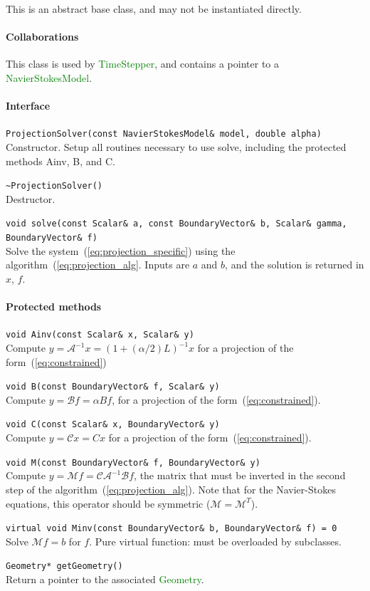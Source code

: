 \documentclass[11pt]{article}
\def\class#1{\textcolor{green}{\ttfamily\small #1}} %
\def\fn#1{{\ttfamily\small #1}} %
\let\code\lstinline
\begin{document}
This is an abstract base class, and may not be instantiated directly.

\paragraph{Collaborations}
This class is used by \class{TimeStepper}, and contains a pointer to a \class{NavierStokesModel}.

\paragraph{Interface}
\begin{description}
	\item \code|ProjectionSolver(const NavierStokesModel& model, double alpha)|\\
		Constructor.  Setup all routines necessary to use \fn{solve}, including the protected methods \fn{Ainv}, \fn{B}, and \fn{C}.
	\item \code|~ProjectionSolver()|\\
		Destructor.
	\item \code|void solve(const Scalar& a, const BoundaryVector& b, Scalar& gamma, BoundaryVector& f)|\\
	 	Solve the system~(\ref{eq:projection_specific}) using the algorithm~(\ref{eq:projection_alg}.  Inputs are $a$ and $b$, and the solution is returned in $x$, $f$.
\end{description}
\paragraph{Protected methods}
\begin{description}
	\item \code|void Ainv(const Scalar& x, Scalar& y)|\\
		Compute $y = \mathcal{A}^{-1}x=(1+(\alpha/2)L)^{-1}x$ for a projection of the form~(\ref{eq:constrained})
	\item \code|void B(const BoundaryVector& f, Scalar& y)|\\
		Compute $y = \mathcal{B}f=\alpha Bf$, for a projection of the form~(\ref{eq:constrained}).
	\item \code|void C(const Scalar& x, BoundaryVector& y)|\\
		Compute $y = \mathcal{C}x=Cx$ for a projection of the form~(\ref{eq:constrained}).
	\item \code|void M(const BoundaryVector& f, BoundaryVector& y)|\\
		Compute $y = \mathcal{M}f=\mathcal{C}\mathcal{A}^{-1}\mathcal{B}f$, the matrix that must be inverted in the second step of the algorithm~(\ref{eq:projection_alg}).  Note that for the Navier-Stokes equations, this operator should be symmetric ($\mathcal{M}=\mathcal{M}^T$).
	\item \code|virtual void Minv(const BoundaryVector& b, BoundaryVector& f) = 0|\\
		Solve $\mathcal{M}f=b$ for $f$.  Pure virtual function: must be overloaded by subclasses.
	\item \code|Geometry* getGeometry()|\\
		Return a pointer to the associated \class{Geometry}.
\end{description}
\end{document}
